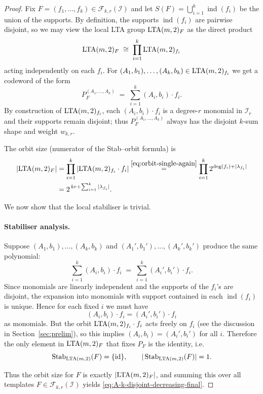 \documentclass[conference]{IEEEtran}
\theoremstyle{definition}
\newcommand{\I}{\mathcal{I}}
\newcommand{\ind}{\operatorname{ind}}
\newcommand{\Stab}{\operatorname{Stab}}
\newcommand{\Alow}{{\rm LTA}(m,2)}
\begin{document}
\begin{proof}
Fix $F=(f_1,\dots,f_k)\in\mathcal F_{k,r}(\I)$ and let
$S(F)=\bigcup_{i=1}^k\ind(f_i)$ be the union of the supports.
By definition, the supports $\ind(f_i)$ are pairwise disjoint, so we
may view the local LTA group $\Alow_{F}$ as the direct product
\[
  \Alow_F
  \;\cong\;
  \prod_{i=1}^k \Alow_{f_i}
\]
acting independently on each $f_i$.
For $(A_1,b_1),\dots,(A_k,b_k)\in\Alow_{f_i}$ we get a codeword of the
form
\[
  P_F^{(A_1,\dots,A_k)}
  \;=\;
  \sum_{i=1}^k (A_i,b_i)\cdot f_i.
\]
By construction of $\Alow_{f_i}$, each $(A_i,b_i)\cdot f_i$ is a
degree-$r$ monomial in $\I_r$ and their supports remain disjoint; thus
$P_F^{(A_1,\dots,A_k)}$ always has the disjoint $k$-sum shape and
weight $w_{k,r}$.

The orbit size (numerator of the Stab--orbit formula) is
\[
\begin{aligned}
|\Alow_F|
  &=
  \prod_{i=1}^k |\Alow_{f_i}\cdot f_i|
  \stackrel{\eqref{eq:orbit-single-again}}=
  \prod_{i=1}^k 2^{\deg(f_i)+|\lambda_{f_i}|}
  \\&=
  2^{\,k r + \sum_{i=1}^k|\lambda_{f_i}|}.
\end{aligned}
\]

We now show that the local stabiliser is trivial.

\paragraph*{Stabiliser analysis.}
Suppose $(A_1,b_1),\dots,(A_k,b_k)$ and
$(A_1',b_1'),\dots,(A_k',b_k')$ produce the same polynomial:
\[
  \sum_{i=1}^k (A_i,b_i)\cdot f_i
  \;=\;
  \sum_{i=1}^k (A_i',b_i')\cdot f_i.
\]
Since monomials are linearly independent and the supports of the
$f_i$’s are disjoint, the expansion into monomials with support
contained in each $\ind(f_i)$ is unique.  Hence for each fixed $i$
we must have
\[
  (A_i,b_i)\cdot f_i = (A_i',b_i')\cdot f_i
\]
as monomials.  But the orbit $\Alow_{f_i}\cdot f_i$ acts freely on
$f_i$ (see the discussion in Section~\ref{sec:prelim}), so
this implies $(A_i,b_i)=(A_i',b_i')$ for all $i$.
Therefore the only element in $\Alow_F$ that fixes $P_F$ is the
identity, i.e.
\[
  \Stab_{\Alow}(F) = \{\mathrm{id}\},
  \qquad
  |\Stab_{\Alow}(F)|=1.
\]

Thus the orbit size for $F$ is exactly $|\Alow_F|$, and summing this
over all templates $F\in\mathcal F_{k,r}(\I)$ yields
\eqref{eq:A-k-disjoint-decreasing-final}.
\end{proof}
\end{document}
